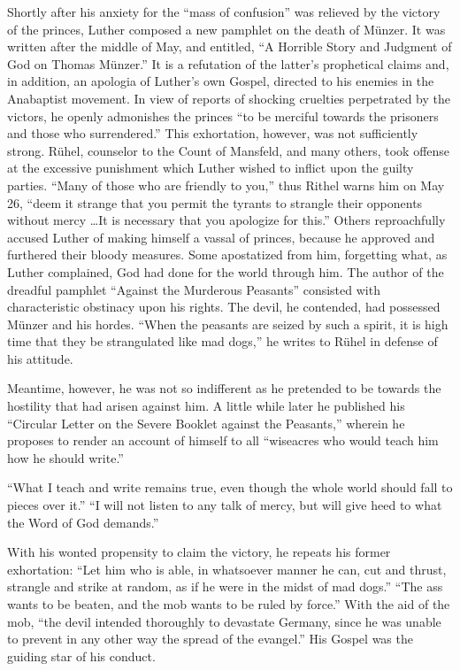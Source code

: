 Shortly after his anxiety for the “mass of confusion” was relieved
by the victory of the princes, Luther composed a new pamphlet on
the death of Münzer. It was written after the middle of May, and
entitled, “A Horrible Story and Judgment of God on Thomas Münzer.”
It is a refutation of the latter’s prophetical claims and, in addition,
an apologia of Luther’s own Gospel, directed to his enemies in
the Anabaptist movement. In view of reports of shocking cruelties
perpetrated by the victors, he openly admonishes the princes “to be
merciful towards the prisoners and those who surrendered.” This
exhortation, however, was not sufficiently strong. Rühel, counselor to
the Count of Mansfeld, and many others, took offense at the excessive
punishment which Luther wished to inflict upon the guilty parties.
“Many of those who are friendly to you,” thus Rithel warns him on
May 26, “deem it strange that you permit the tyrants to strangle
their opponents without mercy \dots It is necessary that you apologize
for this.” Others reproachfully accused Luther of making himself a vassal
of princes, because he approved and furthered their
bloody measures. Some apostatized from him, forgetting what, as
Luther complained, God had done for the world through him. The
author of the dreadful pamphlet “Against the Murderous Peasants''
consisted with characteristic obstinacy upon his rights. The devil, he
contended, had possessed Münzer and his hordes. “When the peasants
are seized by such a spirit, it is high time that they be strangulated
like mad dogs,” he writes to Rühel in defense of his attitude.

Meantime, however, he was not so indifferent as he pretended
to be towards the hostility that had arisen against him. A little while
later he published his “Circular Letter on the Severe Booklet against
the Peasants,” wherein he proposes to render an account of himself to
all “wiseacres who would teach him how he should write.”

“What I teach and write remains true, even though the whole world
should fall to pieces over it.” “I will not listen to any talk of mercy, but
will give heed to what the Word of God demands.”

With his wonted propensity to claim the victory, he repeats his former
exhortation: “Let him who is able, in whatsoever manner he can, cut and
thrust, strangle and strike at random, as if he were in the midst of mad
dogs.” “The ass wants to be beaten, and the mob wants to be ruled by force.”
With the aid of the mob, “the devil intended thoroughly to devastate
Germany, since he was unable to prevent in any other way the spread of the
evangel.” His Gospel was the guiding star of his conduct.


